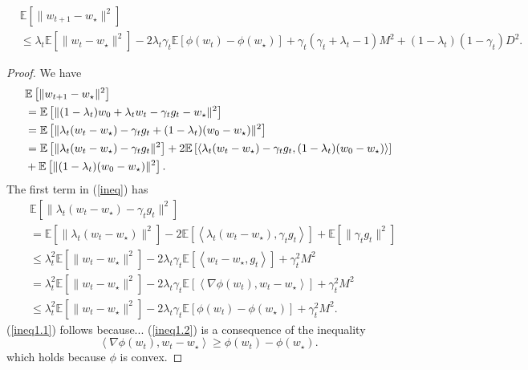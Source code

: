 \begin{lemma}
	\begin{equation}
		\begin{split}
			&\mathbb{E}\left[ \|w_{t+1}-w_\star \|^2 \right]\\
			&\leq
			\lambda_t\mathbb{E}\left[ \|w_t-w_\star\|^2 \right]
			-2\lambda_t\gamma_t\mathbb{E}\left[ \phi(w_t)-\phi(w_\star) \right]
			+\gamma_t(\gamma_t+\lambda_t-1) M^2 + (1-\lambda_t)(1-\gamma_t) D^2.
		\end{split}
	\end{equation}
\end{lemma}
\begin{proof}
	We have
	\begin{align}
		&\mathbb{E}\left[ \|w_{t+1}-w_\star \|^2 \right]\\
		&=\mathbb{E}\left[ \|(1-\lambda_t)w_0+\lambda_t w_t - \gamma_t g_t - w_\star\|^2 \right]\\
		&=\mathbb{E}\left[ \| \lambda_t(w_t-w_\star) -\gamma_t g_t +(1-\lambda_t)(w_0-w_\star)\|^2 \right]\\
		\notag
		&=\mathbb{E}\left[ \|\lambda_t(w_t-w_\star) - \gamma_t g_t\|^2 \right]
		+2\mathbb{E}\left[ \left<\lambda_t(w_t-w_\star) - \gamma_t g_t, (1-\lambda_t)(w_0-w_\star) \right> \right]\\ \label{ineq}
		&+\mathbb{E}\left[ \|(1-\lambda_t)(w_0-w_\star)\|^2 \right].
	\end{align}
	The first term in (\ref{ineq}) has
	\begin{align}
		&\mathbb{E}\left[ \|\lambda_t(w_t-w_\star) - \gamma_t g_t\|^2 \right]\\
		&=\mathbb{E}\left[ \| \lambda_t(w_t-w_\star) \|^2 \right]-
		2\mathbb{E}\left[ \left<\lambda_t(w_t-w_\star),\gamma_t g_t \right> \right]+\mathbb{E}\left[ \|\gamma_t g_t\|^2 \right]\\
		&\leq \lambda_t^2 \mathbb{E}\left[ \|w_t-w_\star\|^2 \right]
		-2\lambda_t\gamma_t\mathbb{E}\left[ \left<w_t-w_\star,g_t \right> \right]
		+\gamma_t^2 M^2\\
		\label{ineq1.1}
		&=\lambda_t^2 \mathbb{E}\left[ \|w_t-w_\star\|^2 \right]
		-2\lambda_t\gamma_t\mathbb{E}\left[ \left<\nabla \phi(w_t),w_t-w_\star \right> \right]
		+\gamma_t^2 M^2\\
		\label{ineq1.2}
		&\leq \lambda_t^2 \mathbb{E}\left[ \|w_t-w_\star\|^2 \right]
		-2\lambda_t\gamma_t\mathbb{E}\left[ \phi(w_t)-\phi(w_\star) \right]+\gamma_t^2 M^2.
	\end{align}
	(\ref{ineq1.1}) follows because...
	(\ref{ineq1.2}) is a consequence of the inequality
	\begin{equation}
		\left<\nabla\phi(w_t), w_t-w_\star \right> \geq \phi(w_t)-\phi(w_\star).
	\end{equation}
	which holds because $\phi$ is convex.
	

\end{proof}
